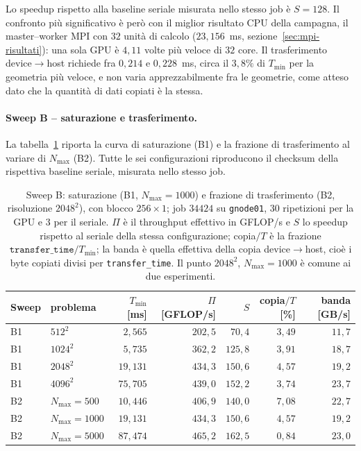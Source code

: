Lo speedup rispetto alla baseline seriale misurata nello stesso job è $S = 128$.
Il confronto più significativo è però con il miglior risultato CPU della campagna,
il master--worker MPI con $32$ unità di calcolo ($23{,}156$~ms,
sezione~\ref{sec:mpi-risultati}): una sola GPU è $4{,}11$ volte più veloce di $32$
core. Il trasferimento device$\to$host richiede fra $0{,}214$ e $0{,}228$~ms,
circa il $3{,}8\%$ di $T_{\min}$ per la geometria più veloce, e non varia
apprezzabilmente fra le geometrie, come atteso dato che la quantità di dati
copiati è la stessa.

\paragraph{Sweep B -- saturazione e trasferimento.}
La tabella~\ref{tab:cuda-scaling} riporta la curva di saturazione (B1) e la
frazione di trasferimento al variare di $N_{\max}$ (B2). Tutte le sei
configurazioni riproducono il checksum della rispettiva baseline seriale,
misurata nello stesso job.
\vspace{2,5mm}
\begin{table}[htbp]
    \centering
    \caption{Sweep B: saturazione (B1, $N_{\max}=1000$) e frazione di trasferimento
        (B2, risoluzione $2048^2$), con blocco $256{\times}1$; job $34424$ su
        \texttt{gnode01}, $30$ ripetizioni per la GPU e $3$ per il seriale. $\Pi$ è
        il throughput effettivo in GFLOP/s e $S$ lo speedup rispetto al seriale
        della stessa configurazione; copia$/T$ è la frazione
        $\texttt{transfer\_time}/T_{\min}$; la banda è quella effettiva della copia
        device$\to$host, cioè i byte copiati divisi per \texttt{transfer\_time}.
        Il punto $2048^2$, $N_{\max}=1000$ è comune ai due esperimenti.}
    \label{tab:cuda-scaling}
    \small
    \begin{tabular}{llrrrrr}
        \hline
        Sweep & problema & $T_{\min}$ [ms] & $\Pi$ [GFLOP/s] & $S$ & copia$/T$ [\%] & banda [GB/s] \\
        \hline
        B1 & $512^2$   & $2{,}565$  & $202{,}5$ & $70{,}4$  & $3{,}49$ & $11{,}7$ \\
        B1 & $1024^2$  & $5{,}735$  & $362{,}2$ & $125{,}8$ & $3{,}91$ & $18{,}7$ \\
        B1 & $2048^2$  & $19{,}131$ & $434{,}3$ & $150{,}6$ & $4{,}57$ & $19{,}2$ \\
        B1 & $4096^2$  & $75{,}705$ & $439{,}0$ & $152{,}2$ & $3{,}74$ & $23{,}7$ \\
        \hline
        B2 & $N_{\max}{=}500$  & $10{,}446$ & $406{,}9$ & $140{,}0$ & $7{,}08$ & $22{,}7$ \\
        B2 & $N_{\max}{=}1000$ & $19{,}131$ & $434{,}3$ & $150{,}6$ & $4{,}57$ & $19{,}2$ \\
        B2 & $N_{\max}{=}5000$ & $87{,}474$ & $465{,}2$ & $162{,}5$ & $0{,}84$ & $23{,}0$ \\
        \hline
    \end{tabular}
\end{table}

